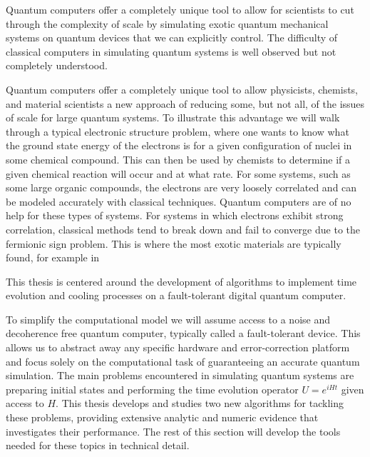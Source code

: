 Quantum computers offer a completely unique tool to allow for scientists to cut through the complexity of scale by simulating exotic quantum mechanical systems on quantum devices that we can explicitly control. The difficulty of classical computers in simulating quantum systems is well observed but not completely understood. 

Quantum computers offer a completely unique tool to allow physicists, chemists, and material scientists a new approach of reducing some, but not all, of the issues of scale for large quantum systems. To illustrate this advantage we will walk through a typical electronic structure problem, where one wants to know what the ground state energy of the electrons is for a given configuration of nuclei in some chemical compound. This can then be used by chemists to determine if a given chemical reaction will occur and at what rate. For some systems, such as some large organic compounds, the electrons are very loosely correlated and can be modeled accurately with classical techniques. Quantum computers are of no help for these types of systems. For systems in which electrons exhibit strong correlation, classical methods tend to break down and fail to converge due to the fermionic sign problem. This is where the most exotic materials are typically found, for example in 


This thesis is centered around the development of algorithms to implement time evolution and cooling processes on a fault-tolerant digital quantum computer. 

To simplify the computational model we will assume access to a noise and decoherence free quantum computer, typically called a fault-tolerant device. This allows us to abstract away any specific hardware and error-correction platform and focus solely on the computational task of guaranteeing an accurate quantum simulation. The main problems encountered in simulating quantum systems are preparing initial states and performing the time evolution operator $U = e^{i H t}$ given access to $H$. This thesis develops and studies two new algorithms for tackling these problems, providing extensive analytic and numeric evidence that investigates their performance. The rest of this section will develop the tools needed for these topics in technical detail. 

